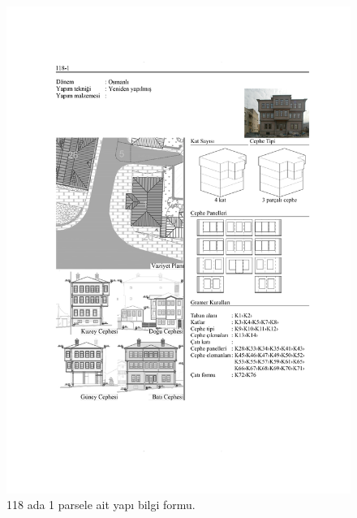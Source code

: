 \begin{figure}
\centering
\includegraphics[width=1\textwidth,height=\textheight]{source/figures/BilgiFormlari/118-1.pdf}
\caption{118 ada 1 parsele ait yapı bilgi formu.}
\end{figure}

